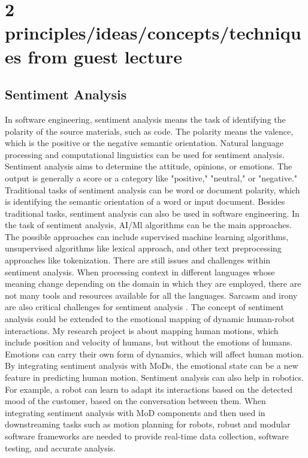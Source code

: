 \documentclass[11pt]{article}
\begin{document}
\section{2 principles/ideas/concepts/techniques from guest lecture}

\subsection{Sentiment Analysis}
In software engineering, sentiment analysis means the task of identifying the polarity of the source materials, such as code. The polarity means the valence, which is the positive or the negative semantic orientation. Natural language processing and computational linguistics can be used for sentiment analysis.  Sentiment analysis aims to determine the attitude, opinions, or emotions. The output is generally a score or a category like "positive," "neutral," or "negative." Traditional tasks of sentiment analysis can be word or document polarity, which is identifying the semantic orientation of a word or input document. Besides traditional tasks, sentiment analysis can also be used in software engineering. In the task of sentiment analysis, AI/Ml algorithms can be the main approaches. The possible approaches can include supervised machine learning algorithms, unsupervised algorithms like lexical approach, and other text preprocessing approaches like tokenization. There are still issues and challenges within sentiment analysis. When processing context in different languages whose meaning change depending on the domain in which they are employed, there are not many tools and resources available for all the languages. Sarcasm and irony are also critical challenges for sentiment analysis \cite{sentimentanalysis}. The concept of sentiment analysis could be extended to the emotional mapping of dynamic human-robot interactions. My research project is about mapping human motions, which include position and velocity of humans, but without the emotions of humans. Emotions can carry their own form of dynamics, which will affect human motion. By integrating sentiment analysis with MoDs, the emotional state can be a new feature in predicting human motion. Sentiment analysis can also help in robotics. For example, a robot can learn to adapt its interactions based on the detected mood of the customer, based on the conversation between them. When integrating sentiment analysis with MoD components and then used in downstreaming tasks such as motion planning for robots, robust and modular software frameworks are needed to provide real-time data collection, software testing, and accurate analysis. 
\end{document}
